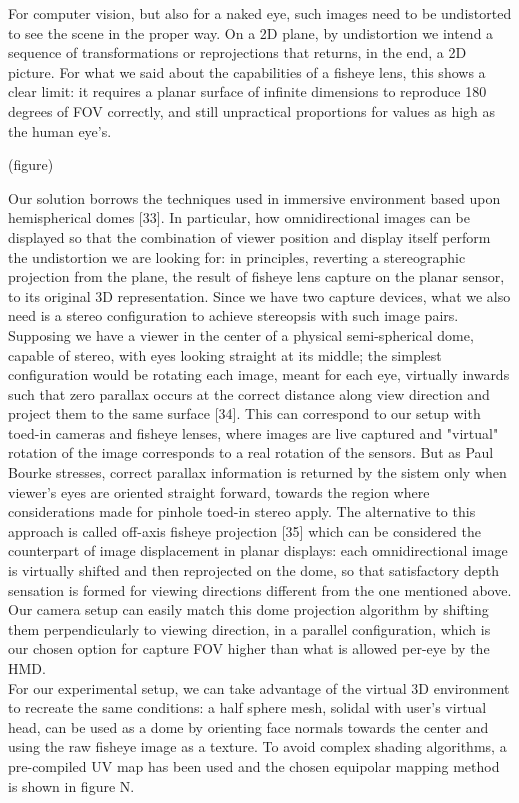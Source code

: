 For computer vision, but also for a naked eye, such images need to be undistorted to see the scene in the proper way. On a 2D plane, by undistortion we intend a sequence of transformations or reprojections that returns, in the end, a 2D picture. For what we said about the capabilities of a fisheye lens, this shows a clear limit: it requires a planar surface of infinite dimensions to reproduce 180 degrees of FOV correctly, and still unpractical proportions for values as high as the human eye's.

(figure)

Our solution borrows the techniques used in immersive environment based upon hemispherical domes [33]. In particular, how omnidirectional images can be displayed so that the combination of viewer position and display itself perform the undistortion we are looking for: in principles, reverting a stereographic projection from the plane, the result of fisheye lens capture on the planar sensor, to its original 3D representation. Since we have two capture devices, what we also need is a stereo configuration to achieve stereopsis with such image pairs. Supposing we have a viewer in the center of a physical semi-spherical dome, capable of stereo, with eyes looking straight at its middle; the simplest configuration would be rotating each image, meant for each eye,  virtually inwards such that zero parallax occurs at the correct distance along view direction and project them to the same surface [34]. This can correspond to our setup with toed-in cameras and fisheye lenses, where images are live captured and "virtual" rotation of the image corresponds to a real rotation of the sensors. But as Paul Bourke stresses, correct parallax information is returned by the sistem only when viewer's eyes are oriented straight forward, towards the region where considerations made for pinhole toed-in stereo apply. The alternative to this approach is called off-axis fisheye projection [35] which can be considered the counterpart of image displacement in planar displays: each omnidirectional image is virtually shifted and then reprojected on the dome, so that satisfactory depth sensation is formed for viewing directions different from the one mentioned above. Our camera setup can easily match this dome projection algorithm by shifting them perpendicularly to viewing direction, in a parallel configuration, which is our chosen option for capture FOV higher than what is allowed per-eye by the HMD.\\
For our experimental setup, we can take advantage of the virtual 3D environment to recreate the same conditions: a half sphere mesh, solidal with user's virtual head,  can be used as a dome by orienting face normals towards the center and using the raw fisheye image as a texture. To avoid complex shading algorithms, a pre-compiled UV map has been used and the chosen equipolar mapping method is shown in figure N.\\
